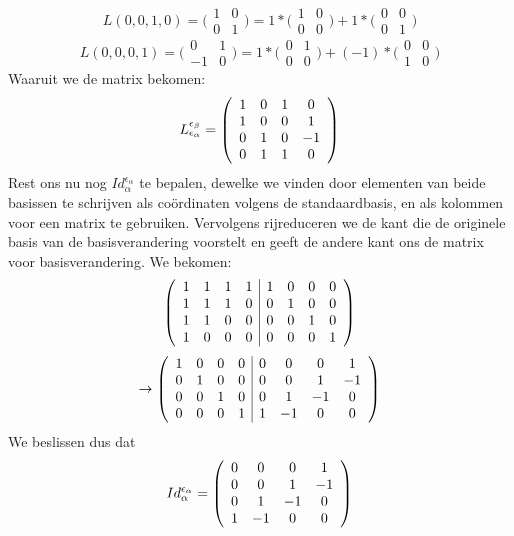 \documentclass[lineaire_algebra_oplossingen.tex]{subfiles}
\begin{document}
\[L(0,0,1,0)=\bigl(\begin{smallmatrix} 1&0\\ 0&1 \end{smallmatrix} \bigr) = 1*\bigl(\begin{smallmatrix} 1&0\\ 0&0 \end{smallmatrix} \bigr) + 1*\bigl(\begin{smallmatrix} 0&0\\ 0&1 \end{smallmatrix} \bigr)\]
\[L(0,0,0,1)=\bigl(\begin{smallmatrix} 0&1\\ -1&0 \end{smallmatrix} \bigr) = 1*\bigl(\begin{smallmatrix} 0&1\\ 0&0 \end{smallmatrix} \bigr) + (-1)*\bigl(\begin{smallmatrix} 0&0\\ 1&0 \end{smallmatrix} \bigr)\]
Waaruit we de matrix bekomen:
\[L^{\epsilon_\beta}_{\epsilon_\alpha} = 
\left(\begin{array}{c c c c}
1 & 0 & 1 & 0 \\ 
1 & 0 & 0 & 1 \\ 
0 & 1 & 0 & -1 \\ 
0 & 1 & 1 & 0 \\ 
\end{array}
\right)
\]
Rest ons nu nog $Id^{\epsilon_\alpha}_{\alpha}$ te bepalen, dewelke we vinden door elementen van beide basissen te schrijven als co\"ordinaten volgens de standaardbasis, en als kolommen voor een matrix te gebruiken. Vervolgens rijreduceren we de kant die de originele basis van de basisverandering voorstelt en geeft de andere kant ons de matrix voor basisverandering. We bekomen:
\[
\left(
\begin{array}{c c c c | c c c c}
1 & 1 & 1 & 1 & 1 & 0 & 0 & 0 \\ 
1 & 1 & 1 & 0 & 0 & 1 & 0 & 0 \\ 
1 & 1 & 0 & 0 & 0 & 0 & 1 & 0 \\ 
1 & 0 & 0 & 0 & 0 & 0 & 0 & 1 \\ 
\end{array}
\right)
\]
\[
\rightarrow
\left(
\begin{array}{c c c c | c c c c}
1 & 0 & 0 & 0 & 0 & 0 & 0 & 1 \\ 
0 & 1 & 0 & 0 & 0 & 0 & 1 & -1 \\ 
0 & 0 & 1 & 0 & 0 & 1 & -1 & 0 \\ 
0 & 0 & 0 & 1 & 1 & -1 & 0 & 0 \\
\end{array}
\right)
\]
We beslissen dus dat
\[Id^{\epsilon_\alpha}_{\alpha} = \left(
\begin{array}{c c c c}
0 & 0 & 0 & 1 \\ 
0 & 0 & 1 & -1 \\ 
0 & 1 & -1 & 0 \\ 
1 & -1 & 0 & 0 \\
\end{array}
\right)
\]
\end{document}
